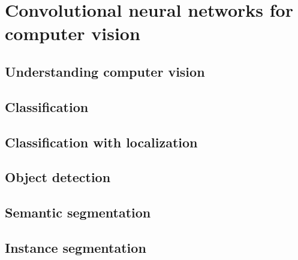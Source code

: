 \chapter{Convolutional neural networks for computer vision}
\label{image-ann}

\section{Understanding computer vision}
\label{computer-vision}

\section{Classification}
\label{classification}


\section{Classification with localization}
\label{classification-localization}


\section{Object detection}
\label{object-detection}


\section{Semantic segmentation}
\label{semantic-segmentation}


\section{Instance segmentation}
\label{instance-segmentation}


